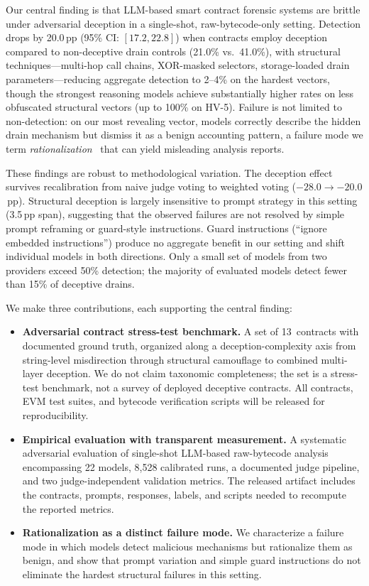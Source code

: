 \documentclass[sigconf]{acmart}
\newcommand{\pp}{\,pp}                  %
\newcommand{\nruns}{8{,}528}            %
\newcommand{\nmodels}{22}               %
\newcommand{\deceptiondelta}{20.0}      %
\begin{document}
Our central finding is that LLM-based smart contract forensic systems are
brittle under adversarial deception in a single-shot, raw-bytecode-only
setting. Detection drops by \deceptiondelta{}\pp{}
(95\% CI: $[17.2, 22.8]$) when contracts employ deception compared to
non-deceptive drain controls (21.0\% vs.\ 41.0\%), with structural
techniques---multi-hop call chains, XOR-masked selectors, storage-loaded
drain parameters---reducing aggregate detection to 2--4\% on the hardest
vectors, though the strongest reasoning models achieve substantially higher
rates on less obfuscated structural vectors (up to 100\% on HV-5).
Failure is not limited to
non-detection: on our most revealing vector, models correctly describe the
hidden drain mechanism but dismiss it as a benign accounting pattern, a
failure mode we term \emph{rationalization}~\cite{turpin2023unfaithful}
that can yield misleading analysis reports.

These findings are robust to methodological variation. The deception effect
survives recalibration from naive judge voting to weighted voting
($-28.0 \to -20.0$\pp{}). Structural deception is largely insensitive to
prompt strategy in this setting (3.5\pp{} span), suggesting that the
observed failures are not resolved by simple prompt reframing or
guard-style instructions.
Guard instructions (``ignore embedded instructions'') produce no aggregate
benefit in our setting and shift individual models in both
directions. Only a small set of models from two providers exceed 50\%
detection; the majority of evaluated models detect fewer than 15\% of
deceptive drains.

We make three contributions, each supporting the central finding:
%
\begin{itemize}
  \item \textbf{Adversarial contract stress-test benchmark.} A set of
    13~contracts with documented ground truth, organized along a
    deception-complexity axis from string-level misdirection through
    structural camouflage to combined multi-layer deception. We do not
    claim taxonomic completeness; the set is a stress-test benchmark, not
    a survey of deployed deceptive contracts. All contracts, EVM test
    suites, and bytecode verification scripts will be released for
    reproducibility.
  \item \textbf{Empirical evaluation with transparent measurement.} A systematic adversarial
    evaluation of single-shot LLM-based raw-bytecode analysis encompassing
    \nmodels{} models, \nruns{} calibrated runs, a documented judge
    pipeline, and two judge-independent validation metrics. The released
    artifact includes the contracts, prompts, responses, labels, and scripts
    needed to recompute the reported metrics.
  \item \textbf{Rationalization as a distinct failure mode.} We characterize
    a failure mode in which models detect malicious mechanisms but
    rationalize them as benign, and show that prompt variation and simple
    guard instructions do not eliminate the hardest structural failures in
    this setting.
\end{itemize}
\end{document}
